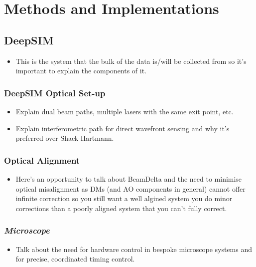 \chapter{Methods and Implementations}

\section{DeepSIM}
\label{sec:DeepSIM}

\begin{itemize}
	\item This is the system that the bulk of the data is/will be collected from so it's important to explain the components of it.
\end{itemize}

	\subsection{DeepSIM Optical Set-up}
	\label{subsec:DeepSIM_optics}
	
	\begin{itemize}
		\item Explain dual beam paths, multiple lasers with the same exit point, etc.
		\item Explain interferometric path for direct wavefront sensing and why it's preferred over Shack-Hartmann.
	\end{itemize}

	\subsection{Optical Alignment}
	\label{subsec:alignment}
	
	\begin{itemize}
		\item Here's an opportunity to talk about BeamDelta and the need to minimise optical misalignment as DMs (and  AO components in general) cannot offer infinite correction so you still want a well algined system you do minor corrections than a poorly aligned system that you can't fully correct.
	\end{itemize}

	\subsection{\textit{Microscope}}
	\label{subsec:microscope}
	
	\begin{itemize}
		\item Talk about the need for hardware control in bespoke microscope systems and for precise, coordinated timing control.
	\end{itemize}

